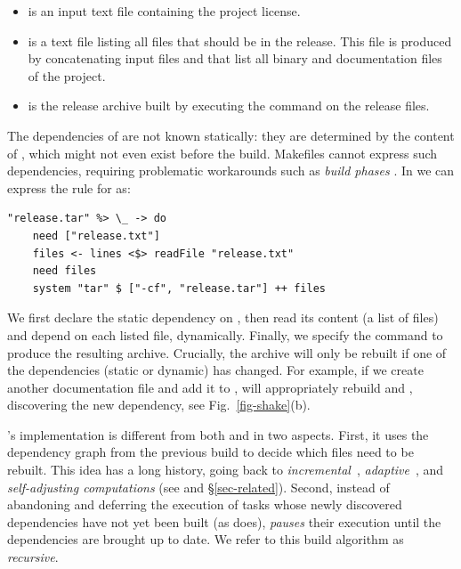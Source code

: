\begin{itemize}
    \item {} is an input text file containing the project license.
    \item {} is a text file listing all files that should be in the release. This file
    is produced by concatenating input files  and 
    that list all binary and documentation files of the project.
    \item {} is the release archive built by executing the
    command  on the release files.
\end{itemize}

The dependencies of  are not known statically: they are
determined by the content of , which might not even exist
before the build. Makefiles cannot express such dependencies, requiring problematic
workarounds such as \emph{build phases} \cite{hadrian}.
In \Shake we can express the rule for  as:

\begin{verbatim}
"release.tar" %> \_ -> do
    need ["release.txt"]
    files <- lines <$> readFile "release.txt"
    need files
    system "tar" $ ["-cf", "release.tar"] ++ files
\end{verbatim}

\noindent
We first declare the static dependency on , then read its
content (a list of files) and depend on each listed file, dynamically. Finally, we specify the
command to produce the resulting archive. Crucially, the archive will only be
rebuilt if one of the dependencies (static or dynamic) has changed. For example,
if we create another documentation file  and add it to
, \Shake will appropriately rebuild  and
, discovering the new dependency, see Fig.~\ref{fig-shake}(b).

\Shake's implementation is different from both \Make and \Excel in two aspects.
First, it uses the dependency graph from the previous build to decide which
files need to be rebuilt. This idea has a long history, going back to
\emph{incremental}~\cite{demers1981incremental},
\emph{adaptive}~\cite{acar2002adaptive}, and
\emph{self-adjusting computations} (see \cite{acar2007selfadjusting} and \S\ref{sec-related}).
Second, instead of abandoning
and deferring the execution of tasks whose newly discovered dependencies have
not yet been built (as \Excel does), \Shake \emph{pauses} their execution until
the dependencies are brought up to date. We refer to this build algorithm as
\emph{recursive}.

